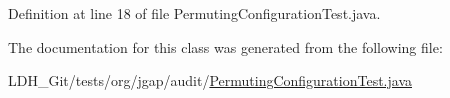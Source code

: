 Definition at line 18 of file Permuting\-Configuration\-Test.\-java.



The documentation for this class was generated from the following file\-:\begin{DoxyCompactItemize}
\item 
L\-D\-H\-\_\-\-Git/tests/org/jgap/audit/\hyperlink{_permuting_configuration_test_8java}{Permuting\-Configuration\-Test.\-java}\end{DoxyCompactItemize}
